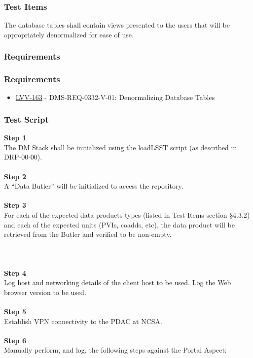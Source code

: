\hypertarget{test-items-14}{%
\subsubsection{Test Items}\label{test-items-14}}

The database tables shall contain views presented to the users that will
be appropriately denormalized for ease of use.

\hypertarget{requirements-28}{%
\subsubsection{Requirements}\label{requirements-28}}

\hypertarget{requirements-29}{%
\subsubsection{Requirements}\label{requirements-29}}

\begin{itemize}
\tightlist
\item
  \href{https://jira.lsstcorp.org/browse/LVV-163}{LVV-163} -
  DMS-REQ-0332-V-01: Denormalizing Database Tables
\end{itemize}

\hypertarget{test-script-14}{%
\subsubsection{Test Script}\label{test-script-14}}

\textbf{Step 1}\\
The DM Stack shall be initialized using the loadLSST script (as
described in DRP-00-00).\\
~\\
\textbf{Step 2}\\
A ``Data Butler'' will be initialized to access the repository.\\
~\\
\textbf{Step 3}\\
For each of the expected data products types (listed in Test Items
section §4.3.2) and each of the expected units (PVIs, coadds, etc), the
data product will be retrieved from the Butler and verified to be
non-empty.\\
~\\
~\\
~\\
\textbf{Step 4}\\
Log host and networking details of the client host to be used. Log the
Web browser version to be used.\\
~\\
\textbf{Step 5}\\
Establish VPN connectivity to the PDAC at NCSA.\\
~\\
\textbf{Step 6}\\
Manually perform, and log, the following steps against the Portal
Aspect:

